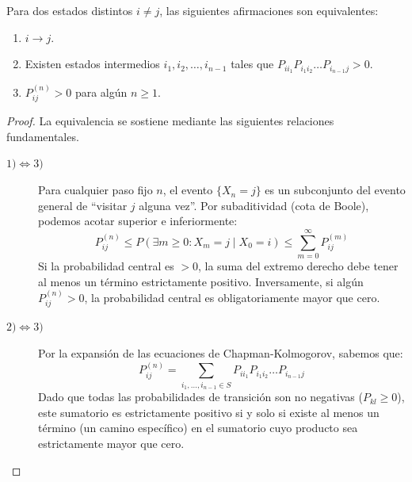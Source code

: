 \begin{teo}
    Para dos estados distintos $i \neq j$, las siguientes afirmaciones son equivalentes:
    \begin{enumerate}
        \item $i \to j$.
        \item Existen estados intermedios $i_1, i_2, \dots, i_{n-1}$ tales que $P_{i i_1} P_{i_1 i_2} \dots P_{i_{n-1} j} > 0$.
        \item $P_{ij}^{(n)} > 0$ para algún $n \geq 1$.
    \end{enumerate}

\begin{proof}
    La equivalencia se sostiene mediante las siguientes relaciones fundamentales.
    \begin{description}
        \item[$1) \iff 3)$] Para cualquier paso fijo $n$, el evento $\{X_n = j\}$ es un subconjunto del evento general de ``visitar $j$ alguna vez''. Por subaditividad (cota de Boole), podemos acotar superior e inferiormente:
        \[ 
        P_{ij}^{(n)} \leq P(\exists m \geq 0 : X_m = j \mid X_0 = i) \leq \sum_{m=0}^{\infty} P_{ij}^{(m)} 
        \]
        Si la probabilidad central es $> 0$, la suma del extremo derecho debe tener al menos un término estrictamente positivo. Inversamente, si algún $P_{ij}^{(n)} > 0$, la probabilidad central es obligatoriamente mayor que cero.
        \item[$2)\iff 3)$] Por la expansión de las ecuaciones de Chapman-Kolmogorov, sabemos que:
        \[ 
        P_{ij}^{(n)} = \sum_{i_1, \dots, i_{n-1} \in S} P_{i i_1} P_{i_1 i_2} \dots P_{i_{n-1} j} 
        \]
        Dado que todas las probabilidades de transición son no negativas ($P_{kl} \geq 0$), este sumatorio es estrictamente positivo si y solo si existe al menos un término (un camino específico) en el sumatorio cuyo producto sea estrictamente mayor que cero.
    \end{description}
\end{proof}
\end{teo}

